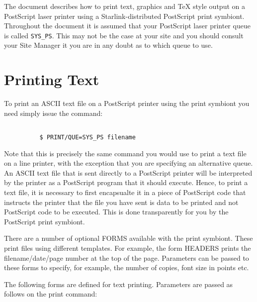 The document describes how to print text, graphics and \TeX\/ style output on a
PostScript laser printer using a Starlink-distributed PostScript print
symbiont. Throughout the document it is assumed that your PostScript laser
printer queue is called {\tt SYS\_PS}. This may not be the case at your site
and you should consult your Site Manager it you are in any doubt as to which
queue to use. 

\section{Printing Text}

To print an ASCII text file on a PostScript printer using the print symbiont
you need simply issue the command:

\begin{verbatim}

          $ PRINT/QUE=SYS_PS filename

\end{verbatim}

Note that this is precisely the same command you would use to print a text file
on a line printer, with the exception that you are specifying an alternative
queue. An ASCII text file that is sent directly to a PostScript printer will be
interpreted by the printer as a PostScript program that it should execute.
Hence, to print a text file, it is necessary to first encapsualte it in a piece
of PostScript code that instructs the printer that the file you have sent is
data to be printed and not PostScript code to be executed. This is done
transparently for you by the PostScript print symbiont.

There are a number of optional FORMS available with the print symbiont. These
print files using different templates. For example, the form HEADERS prints
the filename/date/page number at the top of the page. Parameters can be passed
to these forms to specify, for example, the number of copies, font size in
points etc.

The following forms are defined for text printing. Parameters are passed as
follows on the print command:


